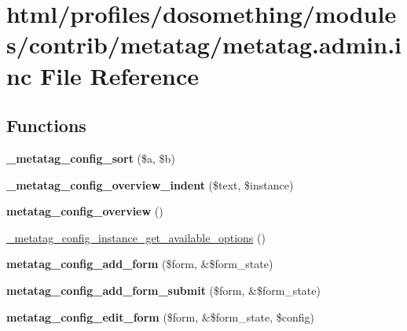\hypertarget{metatag_8admin_8inc}{
\section{html/profiles/dosomething/modules/contrib/metatag/metatag.admin.inc File Reference}
\label{metatag_8admin_8inc}
}
\subsection*{Functions}
\begin{DoxyCompactItemize}
\item 
\hypertarget{metatag_8admin_8inc_aedbf599e1aac47d347e8c7a6a439c9cf}{
{\bfseries \_\-metatag\_\-config\_\-sort} (\$a, \$b)}
\label{metatag_8admin_8inc_aedbf599e1aac47d347e8c7a6a439c9cf}

\item 
\hypertarget{metatag_8admin_8inc_a1784311595c487dd48ff0b44e5b7dc32}{
{\bfseries \_\-metatag\_\-config\_\-overview\_\-indent} (\$text, \$instance)}
\label{metatag_8admin_8inc_a1784311595c487dd48ff0b44e5b7dc32}

\item 
\hypertarget{metatag_8admin_8inc_a38d735200d60f22db202aab9e23bc059}{
{\bfseries metatag\_\-config\_\-overview} ()}
\label{metatag_8admin_8inc_a38d735200d60f22db202aab9e23bc059}

\item 
\hyperlink{metatag_8admin_8inc_a7be401cb17d6ed4b506e3d9257a5a90b}{\_\-metatag\_\-config\_\-instance\_\-get\_\-available\_\-options} ()
\item 
\hypertarget{metatag_8admin_8inc_aaa28fcd376a434b3ee687dc0372e4ca3}{
{\bfseries metatag\_\-config\_\-add\_\-form} (\$form, \&\$form\_\-state)}
\label{metatag_8admin_8inc_aaa28fcd376a434b3ee687dc0372e4ca3}

\item 
\hypertarget{metatag_8admin_8inc_a8db89b7d7575d4625d187c12aa7c395b}{
{\bfseries metatag\_\-config\_\-add\_\-form\_\-submit} (\$form, \&\$form\_\-state)}
\label{metatag_8admin_8inc_a8db89b7d7575d4625d187c12aa7c395b}

\item 
\hypertarget{metatag_8admin_8inc_a62b802bd1d9c1aa674c0841dca543333}{
{\bfseries metatag\_\-config\_\-edit\_\-form} (\$form, \&\$form\_\-state, \$config)}
\label{metatag_8admin_8inc_a62b802bd1d9c1aa674c0841dca543333}


\end{DoxyCompactItemize}
